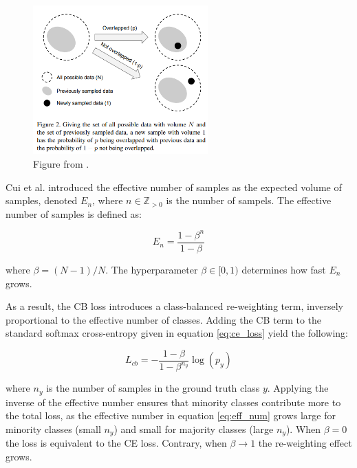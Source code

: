 \begin{figure}[h!]
    \centering
    \includegraphics[width=0.6\textwidth]{Images/CB_feature_space.png}
    \caption{Figure from \cite{cui2019classbalancedlossbasedeffective}. }
    \label{fig:cb_featue_space}
\end{figure}

Cui et al. \cite{cui2019classbalancedlossbasedeffective} introduced the effective number of samples as the expected volume of samples, denoted $E_n$, where $n \in \mathbb{Z}_{>0}$ is the number of sampels. The effective number of samples 
is defined as:

\begin{equation}
    \label{eq:eff_num}
    E_n = \frac{1-\beta^n}{1-\beta}
\end{equation}

where $\beta = (N-1)/N$. The hyperparameter $\beta \in [0,1)$ determines how fast $E_n$ grows.

As a result, the CB loss introduces a class-balanced re-weighting term, inversely proportional to the effective number of classes. Adding the CB term to the standard softmax cross-entropy given in equation \eqref{eq:ce_loss} yield the following:

\begin{equation}
    \label{eq:cb_loss}
    L_{cb} = - \frac{1 - \beta}{1 - \beta^{n_y}} \log(p_y)
\end{equation}

where $n_y$ is the number of samples in the ground truth class $y$. Applying the inverse of the effective number ensures that minority classes contribute more to the total loss, as the effective number in equation \eqref{eq:eff_num} grows large for minority classes (small $n_y$) and small for majority classes (large $n_y$). When $\beta = 0$ the loss is equivalent to the CE loss. Contrary, when $\beta \longrightarrow 1$ the re-weighting effect grows.

